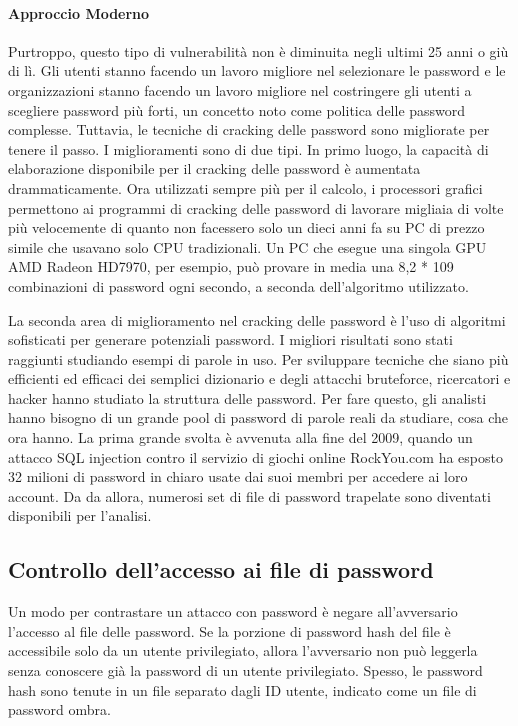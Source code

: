 \paragraph{Approccio Moderno}
Purtroppo, questo tipo di vulnerabilità non è diminuita negli ultimi 25 anni o giù di lì. Gli utenti stanno facendo un lavoro migliore nel selezionare le password e le organizzazioni stanno facendo un lavoro migliore nel costringere gli utenti a scegliere password più forti, un concetto noto come politica delle password complesse. Tuttavia, le tecniche di cracking delle password sono migliorate per tenere il passo. I miglioramenti sono di due tipi. In primo luogo, la capacità di elaborazione disponibile per il cracking delle password è aumentata drammaticamente. Ora utilizzati sempre più per il calcolo, i processori grafici permettono ai programmi di cracking delle password di lavorare migliaia di volte più velocemente di quanto non facessero solo un dieci anni fa su PC di prezzo simile che usavano solo CPU tradizionali. Un PC che esegue una singola GPU AMD Radeon HD7970, per esempio, può provare in media una 8,2 * 109 combinazioni di password ogni secondo, a seconda dell'algoritmo utilizzato.

\singlespacing

La seconda area di miglioramento nel cracking delle password è l'uso di algoritmi sofisticati per generare potenziali password. I migliori risultati sono stati raggiunti studiando esempi di parole in uso. Per sviluppare tecniche che siano più efficienti ed efficaci dei semplici dizionario e degli attacchi bruteforce, ricercatori e hacker hanno studiato la struttura delle password. Per fare questo, gli analisti hanno bisogno di un grande pool di password di parole reali da studiare, cosa che ora hanno. La prima grande svolta è avvenuta alla fine del 2009, quando un attacco SQL injection contro il servizio di giochi online RockYou.com ha esposto 32 milioni di password in chiaro usate dai suoi membri per accedere ai loro account. Da da allora, numerosi set di file di password trapelate sono diventati disponibili per l'analisi.

\newpage
\subsection{Controllo dell'accesso ai file di password}
Un modo per contrastare un attacco con password è negare all'avversario l'accesso al file delle password. Se la porzione di password hash del file è accessibile solo da un utente privilegiato, allora l'avversario non può leggerla senza conoscere già la password di un utente privilegiato. Spesso, le password hash sono tenute in un file separato dagli ID utente, indicato come un file di password ombra.

